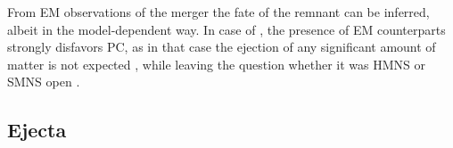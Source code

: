From \ac{EM} observations of the merger the fate of the remnant can be inferred, 
albeit in the model-dependent way. In case of \GW{}, the presence of \ac{EM} counterparts 
strongly disfavors \ac{PC}, as in that case the ejection of any significant amount 
of matter is not expected \citep{Margalit:2017dij,Bauswein:2017vtn,Radice:2017lry}, 
while leaving the question whether it was \ac{HMNS} or \ac{SMNS} open
\citep{Margalit:2017dij,Ai:2018jtv}. 
%
%
%



\subsection{Ejecta} \label{sec:intro:ejecta}

%

